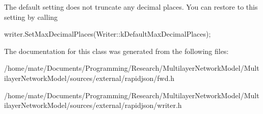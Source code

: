 The default setting does not truncate any decimal places. You can restore to this setting by calling 
\begin{DoxyCode}
writer.SetMaxDecimalPlaces(Writer::kDefaultMaxDecimalPlaces);
\end{DoxyCode}
 

The documentation for this class was generated from the following files\+:\begin{DoxyCompactItemize}
\item 
/home/mate/\+Documents/\+Programming/\+Research/\+Multilayer\+Network\+Model/\+Multilayer\+Network\+Model/sources/external/rapidjson/fwd.\+h\item 
/home/mate/\+Documents/\+Programming/\+Research/\+Multilayer\+Network\+Model/\+Multilayer\+Network\+Model/sources/external/rapidjson/writer.\+h\end{DoxyCompactItemize}

